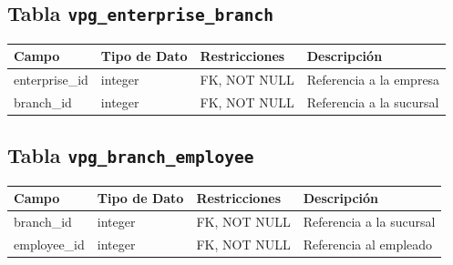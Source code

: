 \begin{center}
	\subsection{Tabla \texttt{vpg\_enterprise\_branch}}
	\begin{tabular}{|l|l|l|l|}
		\hline
		\textbf{Campo} & \textbf{Tipo de Dato} & \textbf{Restricciones} & \textbf{Descripción}     \\
		\hline
		enterprise\_id & integer               & FK, NOT NULL           & Referencia a la empresa  \\
		branch\_id     & integer               & FK, NOT NULL           & Referencia a la sucursal \\
		\hline
	\end{tabular}

	\subsection{Tabla \texttt{vpg\_branch\_employee}}
	\begin{tabular}{|l|l|l|l|}
		\hline
		\textbf{Campo} & \textbf{Tipo de Dato} & \textbf{Restricciones} & \textbf{Descripción}     \\
		\hline
		branch\_id     & integer               & FK, NOT NULL           & Referencia a la sucursal \\
		employee\_id   & integer               & FK, NOT NULL           & Referencia al empleado   \\
		\hline
	\end{tabular}
\end{center}


